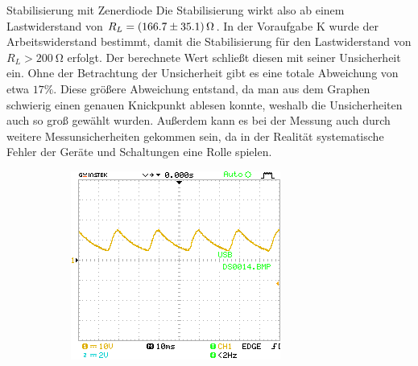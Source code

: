 \documentclass{article}
\theoremstyle{definition}
\begin{document}
\begin{aufgabe}{Stabilisierung mit Zenerdiode}
Die Stabilisierung wirkt also ab einem Lastwiderstand von $R_L = \SI{166.7\pm 35.1}{\ohm}$. In der Voraufgabe K wurde der Arbeitswiderstand bestimmt, damit die Stabilisierung für den Lastwiderstand von $R_L > \SI{200}{\ohm}$ erfolgt. Der berechnete Wert schließt diesen mit seiner Unsicherheit ein. Ohne der Betrachtung der Unsicherheit gibt es eine totale Abweichung von etwa $17\%$. Diese größere Abweichung entstand, da man aus dem Graphen schwierig einen genauen Knickpunkt ablesen konnte, weshalb die Unsicherheiten auch so groß gewählt wurden. Außerdem kann es bei der Messung auch durch weitere Messunsicherheiten gekommen sein, da in der Realität systematische Fehler der Geräte und Schaltungen eine Rolle spielen.


\begin{figure}[h!]
    \centering
    \begin{subfigure}[b]{0.45\textwidth}
        \includegraphics[width=\textwidth]{MesswerteVersuch2/DS0014.png}
    \end{subfigure}
    \hfill
    \begin{subfigure}[b]{0.45\textwidth}

\end{subfigure}
\end{figure}
\end{aufgabe}
\end{document}
